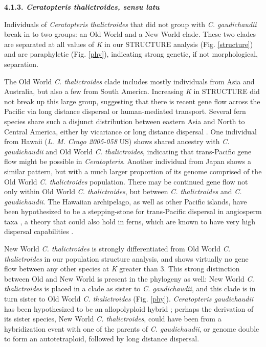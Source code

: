 \documentclass[12pt]{article}
\begin{document}
\begin{flushleft}
\textbf{4.1.3. \textit{Ceratopteris thalictroides, sensu latu}}

Individuals of \textit{Ceratopteris thalictroides} that did not group with \textit{C. gaudichaudii} break in to two groups: an Old World and a New World clade. These two clades are separated at all values of \textit{K} in our {\small{STRUCTURE}} analysis (Fig. \ref{structure}) and are paraphyletic (Fig. \ref{phy}), indicating strong genetic, if not morphological, separation.

The Old World \textit{C. thalictroides} clade includes mostly individuals from Asia and Australia, but also a few from South America. Increasing \textit{K} in {\small{STRUCTURE}} did not break up this large group, suggesting that there is recent gene flow across the Pacific via long distance dispersal or human-mediated transport. Several fern species share such a disjunct distribution between eastern Asia and North to Central America, either by vicariance or long distance dispersal \autocite{Kato1983}. One individual from Hawaii (\textit{L. M. Crago 2005-058} US) shows shared ancestry with \textit{C. gaudichaudii} and Old World \textit{C. thalictroides}, indicating that trans-Pacific gene flow might be possible in \textit{Ceratopteris}. Another individual from Japan shows a similar pattern, but with a much larger proportion of its genome comprised of the Old World \textit{C. thalictroides} population. There may be continued gene flow not only within Old World \textit{C. thalictroides}, but between \textit{C. thalictroides} and \textit{C. gaudichaudii}. The Hawaiian archipelago, as well as other Pacific islands, have been hypothesized to be a stepping-stone for trans-Pacific dispersal in angiosperm taxa \autocite{Harbaugh2009, Wright2001}, a theory that could also hold in ferns, which are known to have very high dispersal capabilities \autocite{Barrington1993, Tryon1970}. 

New World \textit{C. thalictroides} is strongly differentiated from Old World \textit{C. thalictroides} in our population structure analysis, and shows virtually no gene flow between any other species at \textit{K} greater than 3. This strong distinction between Old and New World is present in the phylogeny as well: New World \textit{C. thalictroides} is placed in a clade as sister to \textit{C. gaudichaudii}, and this clade is in turn sister to Old World \textit{C. thalictroides} (Fig. \ref{phy}). \textit{Ceratopteris gaudichaudii} has been hypothesized to be an allopolyploid hybrid \autocite{Adjie2007}; perhaps the derivation of its sister species, New World \textit{C. thalictroides}, could have been from a hybridization event with one of the parents of \textit{C. gaudichaudii}, or genome double to form an autotetraploid, followed by long distance dispersal.


\end{flushleft}
\end{document}
